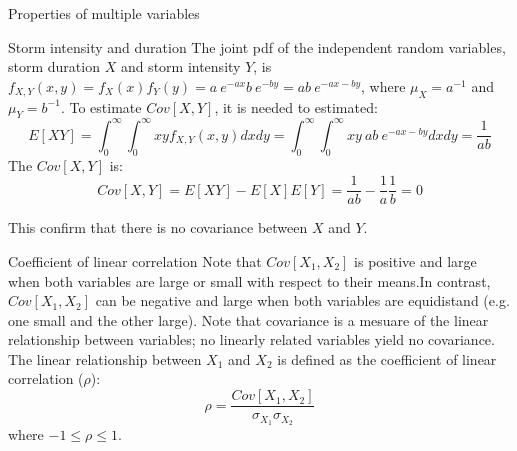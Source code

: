 \documentclass[8pt]{beamer}
\renewcommand{\emph}[1]{\textcolor{myorange}{#1}}
\begin{document}
\begin{frame}{Properties of multiple variables}
    \begin{exampleblock}{Storm intensity and duration}
        The joint \emph{pdf} of the independent random variables, storm duration $X$ and storm intensity $Y$, is $f_{X,Y} (x,y)= f_X (x) f_Y (y) = a \ e^{-ax} b \ e^{-by} = ab \ e^{-ax-by}$, where $\mu_X = a^{-1}$ and $\mu_Y = b^{-1}$. To estimate $Cov[X,Y]$, it is needed to estimated:
        \[
            E[XY] = \int_{0}^{\infty} \int_{0}^{\infty} xy f_{X,Y} (x,y) dx dy = \int_{0}^{\infty} \int_{0}^{\infty} xy \ ab \ e^{-ax - by} dx dy = \frac{1}{ab}
        \]
        The $Cov[X,Y]$ is:
        \[
            Cov[X,Y] = E[XY] - E[X] E[Y] = \frac{1}{ab} - \frac{1}{a}\frac{1}{b} = 0
        \]

        This confirm that there is no covariance between $X$ and $Y$.
    \end{exampleblock}
    \begin{block}{Coefficient of linear correlation}
    Note that $Cov[X_1,X_2]$ is positive and large when both variables are large or small with respect to their means.In contrast,  $Cov[X_1,X_2]$ can be negative and large when both variables are equidistand (e.g. one small and the other large). Note that covariance is a mesuare of the linear relationship between variables; no linearly related variables yield no covariance. The linear relationship between $X_1$ and $X_2$ is defined as the \alert{coefficient of linear correlation ($\rho$)}:
    \[
        \rho = \frac{Cov[X_1, X_2]}{\sigma_{X_1} \sigma_{X_2}}
    \]
    where $-1 \leq \rho \leq 1$.
        \end{block}
\end{frame}
\end{document}
